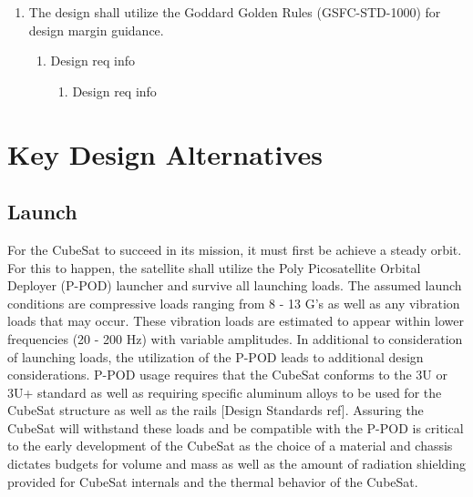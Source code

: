 \documentclass{ece}
\begin{document}
\begin{enumerate}
\begin{enumerate}
\begin{enumerate}
                \item The EoL system will be capable of activation in the event of a DoA scenario. 
                    \begin{itemize}
                        \item Motivation:
                        \item Verification: 
                    \end{itemize}
         \end{enumerate}
    \end{enumerate} %
    \item The design shall utilize the Goddard Golden Rules (GSFC-STD-1000) for design margin guidance.
    \begin{enumerate}
        \item Design req info
        \begin{enumerate}
            \item Design req info
        \end{enumerate}
    \end{enumerate}
\end{enumerate}

\section{Key Design Alternatives}
\subsection{Launch}
For the CubeSat to succeed in its mission, it must first be achieve a steady orbit. For this to happen, the satellite shall utilize the Poly Picosatellite Orbital Deployer (P-POD) launcher and survive all launching loads. The assumed launch conditions are compressive loads ranging from 8 - 13 G's as well as any vibration loads that may occur. These vibration loads are estimated to appear within lower frequencies (20 - 200 Hz) with variable amplitudes. In additional to consideration of launching loads, the utilization of the P-POD leads to additional design considerations. P-POD usage requires that the CubeSat conforms to the 3U or 3U+ standard as well as requiring specific aluminum alloys to be used for the 
CubeSat structure as well as the rails [Design Standards ref]. Assuring the CubeSat will withstand these loads and be compatible with the P-POD is critical to the early development of the CubeSat as the choice of a material and chassis dictates budgets for volume and mass as well as the amount of radiation shielding provided for CubeSat internals and the thermal behavior of the CubeSat.
\end{document}

